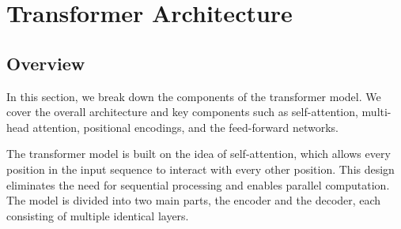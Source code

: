 \section{Transformer Architecture}

\subsection{Overview}

In this section, we break down the components of the transformer model. We cover the overall architecture and key components such as self-attention, multi-head attention, positional encodings, and the feed-forward networks.

The transformer model is built on the idea of self-attention, which allows every position in the input sequence to interact with every other position. This design eliminates the need for sequential processing and enables parallel computation. The model is divided into two main parts, the encoder and the decoder, each consisting of multiple identical layers.

